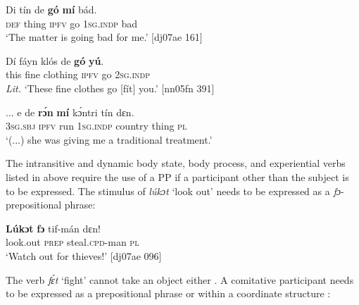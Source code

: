 \ea%
    \label{ex:key:1085}
    \gll Di  tín    de  \textbf{gó}  \textbf{mí}    bád.\\
\textsc{def}  thing  \textsc{ipfv}  go  \textsc{1sg.indp}  bad\\

\glt ‘The matter is going bad for me.’ [dj07ae 161]
\z


\ea%
    \label{ex:key:1086}
    \gll Dí  fáyn    klós    de  \textbf{gó}  \textbf{yú}.\\
this  fine  clothing    \textsc{ipfv}  go  \textsc{2sg.indp}\\

\glt \textit{Lit.} ‘These fine clothes go [fít] you.’ [nn05fn 391]
\z


\ea%
    \label{ex:key:1087}
    \gll \op...\cp{}  e    de  \textbf{rɔ́n}  \textbf{mí}    kɔ́ntri  tín    dɛn.\\
  {} \textsc{3sg.sbj}  \textsc{ipfv}  run  \textsc{1sg.indp}  country  thing  \textsc{pl}\\

\glt ‘(...) she was giving me a traditional treatment.’ 


\z

The intransitive and dynamic body state, body process, and experiential verbs listed in  above require the use of a PP if a participant other than the subject is to be expressed. The stimulus of \textit{lúkɔt} ‘look out’ needs to be expressed as a \textit{fɔ}{}-prepositional phrase: 


\z


\ea%
    \label{ex:key:1089}
    \gll \textbf{Lúkɔt}  \textbf{fɔ} tif-mán      dɛn!\\
look.out  \textsc{prep}  steal\textsc{.cpd}{}-man    \textsc{pl}\\

\glt ‘Watch out for thieves!’ [dj07ae 096]
\z

The verb \textit{fɛ́t} ‘fight’ cannot take an object either . A comitative participant needs to be expressed as a prepositional phrase  or within a coordinate structure :


